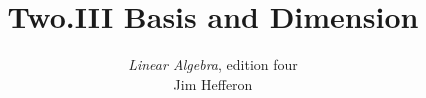 \usepackage{linalgjh}
\usepackage{present}
\usepackage{directories}  %
\usepackage{xr} %
\usepackage{xr} %
\usepackage{xr} %
\usepackage{xr} %
\usepackage{catchfilebetweentags}
\usepackage{etoolbox} %
\makeatletter
\patchcmd{\CatchFBT@Fin@l}{\endlinechar\m@ne}{}
  {}{}
\makeatother

{
}
\hypersetup{colorlinks=true,linkcolor=blue} 

\title[Basis and Dimension] %
{Two.III Basis and Dimension}

\author[Jim Hefferon]{\textit{Linear Algebra}, edition four \\ {\small Jim Hef{}feron}}
\date{}


\subject{Basis and Dimension}


\begin{frame}
  \titlepage
\end{frame}




